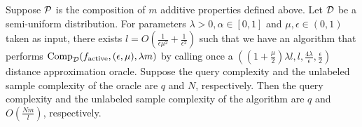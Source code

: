 \begin{lemma}
\label{thm:additive}
Suppose ${\mathcal{P}}$ is the composition of $m$ additive properties defined above. Let ${\mathcal{D}}$ be a semi-uniform distribution. For parameters $\lambda>0,\alpha\in[0,1]$ and $\mu,\epsilon\in(0,1)$ taken as input, there exists $l=O(\frac{1}{\epsilon\mu^2}+\frac{1}{\epsilon^2})$ such that we have an algorithm that performs ${\mathrm{Comp}}_{{\mathcal{D}}}(f_{\mathrm{active}},(\epsilon,\mu),\lambda m)$ by calling once a $((1+\frac{\mu}{2})\lambda l,l,\frac{4\lambda}{\epsilon},\frac{\epsilon}{2})$ distance approximation oracle. Suppose the query complexity and the unlabeled sample complexity of the oracle are $q$ and $N$, respectively. Then the query complexity and the unlabeled sample complexity of the algorithm are $q$ and $O(\frac{Nm}{l})$, respectively.





\end{lemma}

